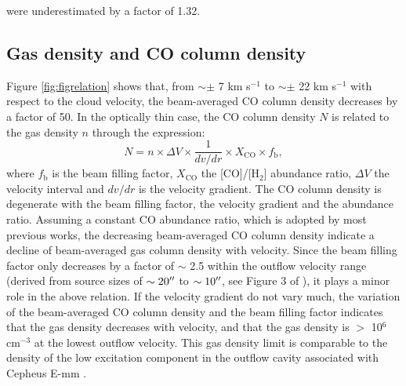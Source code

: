 were underestimated by a factor of 1.32. 


\subsection{Gas density and CO column density}\label{subsec:density}
Figure \ref{fig:figrelation} shows that, from $\sim \pm$ 7 km s$^{-1}$ to $\sim \pm$ 22 km s$^{-1}$ with respect to the cloud velocity, the beam-averaged CO column density decreases by a factor of 50. In the optically thin case, the CO column density $N$ is related to the gas density $n$ through the expression: 
\begin{equation}
N = n \times \Delta V \times \frac{1}{dv/dr} \times X_{\mathrm{CO}} \times f_{\mathrm{b}}, 
\end{equation}
where $f_{\mathrm{b}}$ is the beam filling factor, $X_{\mathrm{CO}}$ the [CO]/[H$_2$] abundance ratio, $\Delta V$ the velocity interval and $dv/dr$ is the velocity gradient. The CO column density is degenerate with the beam filling factor, the velocity gradient and the abundance ratio. Assuming a constant CO abundance ratio, which is adopted by most previous works, the decreasing beam-averaged CO column density indicate a decline of beam-averaged gas column density with velocity. Since the beam filling factor only decreases by a factor of $\sim$ 2.5 within the outflow velocity range (derived from source sizes of $\sim 20\mbox{$^{\prime\prime}$}$ to $\sim 10\mbox{$^{\prime\prime}$}$, see Figure 3 of \citet{2009ApJ...696...66Q}), it plays a minor role in the above relation. If the velocity gradient do not vary much, the variation of the beam-averaged CO column density and the beam filling factor indicates that the gas density decreases with velocity, and that the gas density is $>$ 10$^6$ cm$^{-3}$ at the lowest outflow velocity. This gas density limit is comparable to the density of the low excitation component in the outflow cavity associated with Cepheus E-mm \citep[Several times of 10$^5$ cm$^{-3}$:][]{2015A&A...581A...4L}.

